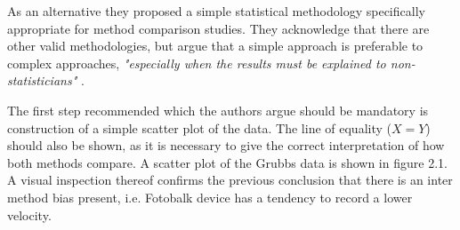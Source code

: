 \documentclass[12pt, a4paper]{report}
\begin{document}
As an alternative they proposed a simple statistical methodology
specifically appropriate for method comparison studies. They
acknowledge that there are other valid methodologies, but argue
that a simple approach is preferable to complex approaches,
\emph{"especially when the results must be explained to
non-statisticians"} \citep*{BA83}.

The first step recommended which the authors argue should be
mandatory is construction of a simple scatter plot of the data.
The line of equality ($X=Y$) should also be shown, as it is
necessary to give the correct interpretation of how both methods
compare. A scatter plot of the Grubbs data is shown in figure 2.1.
A visual inspection thereof confirms the previous conclusion that
there is an inter method bias present, i.e. Fotobalk device has a
tendency to record a lower velocity.
\end{document}
